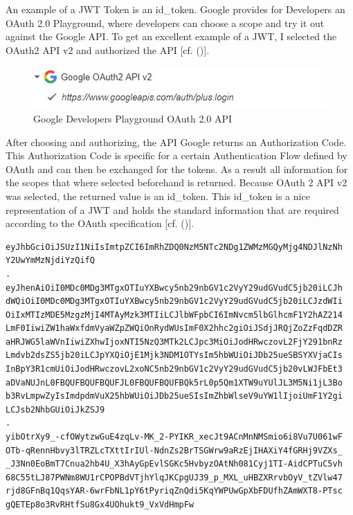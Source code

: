 {{An example of a JWT Token is an id\_token. Google provides for Developers an OAuth 2.0 Playground, where developers can choose a scope and try it out against the Google API. To get an excellent example of a JWT, I selected the OAuth2 API v2 and authorized the API [cf. (\cite{Google:2018:OAuthPlayground})].


\begin{figure}[h]
	\centering
	\includegraphics[width=0.8\linewidth]{images/googleOAuthPlaygroundOAuthAPI}
	\caption[OAuth API]{Google Developers Playground OAuth 2.0 API}
	\label{fig:googleoauthplaygroundoauthapi}
\end{figure}

After choosing and authorizing, the API Google returns an Authorization Code. This Authorization Code is specific for a certain Authentication Flow defined by OAuth and can then be exchanged for the tokens. As a result all information for the scopes that where selected beforehand is returned. Because OAuth 2 API v2 was selected, the returned value is an id\_token. This id\_token is a nice representation of a JWT and holds the standard information that are required according to the OAuth specification  [cf. (\cite{Google:2018:OAuthPlayground})].



\begin{lstlisting}
eyJhbGciOiJSUzI1NiIsImtpZCI6ImRhZDQ0NzM5NTc2NDg1ZWMzMGQyMjg4NDJlNzNh
Y2UwYmMzNjdiYzQifQ
.
eyJhenAiOiI0MDc0MDg3MTgxOTIuYXBwcy5nb29nbGV1c2VyY29udGVudC5jb20iLCJh
dWQiOiI0MDc0MDg3MTgxOTIuYXBwcy5nb29nbGV1c2VyY29udGVudC5jb20iLCJzdWIi
OiIxMTIzMDE5MzgzMjI4MTAyMzk3MTIiLCJlbWFpbCI6ImNvcm5lbGlhcmF1Y2hAZ214
LmF0IiwiZW1haWxfdmVyaWZpZWQiOnRydWUsImF0X2hhc2giOiJSdjJRQjZoZzFqdDZR
aHRJWG5laWVnIiwiZXhwIjoxNTI5NzQ3MTk2LCJpc3MiOiJodHRwczovL2FjY291bnRz
Lmdvb2dsZS5jb20iLCJpYXQiOjE1Mjk3NDM1OTYsIm5hbWUiOiJDb25ueSBSYXVjaCIs
InBpY3R1cmUiOiJodHRwczovL2xoNC5nb29nbGV1c2VyY29udGVudC5jb20vLWJFbEt3
aDVaNUJnL0FBQUFBQUFBQUFJL0FBQUFBQUFBQk5rL0p5Qm1XTW9uYUlJL3M5Ni1jL3Bo
b3RvLmpwZyIsImdpdmVuX25hbWUiOiJDb25ueSIsImZhbWlseV9uYW1lIjoiUmF1Y2gi
LCJsb2NhbGUiOiJkZSJ9
.
yibOtrXy9_-cfOWytzwGuE4zqLv-MK_2-PYIKR_xecJt9ACnMnNMSmio6i8Vu7U061wF
OTb-qRennHbvy3lTRZLcTXttIrIUl-NdnZs2BrTSGWrw9aRzEjIHAXiY4fGRHj9VZXs_
_J3Nn0EoBmT7Cnua2hb4U_X3hAyGpEvlSGKc5HvbyzOAtNh081Cyj1TI-AidCPTuC5vh
68C55tLJ87PWNm8WU1rCPOPBdVTjhYlqJKCpgUJ39_p_MXL_uHBZXRrvbOyV_tZVlw47
rjd8GFnBq1QqsYAR-6wrFbNL1pY6tPyriqZnQdi5KqYWPUwGpXbFDUfhZAmWXT8-PTsc
gQETEp8o3RvRHtfSu8Gx4UOhukt9_VxVdHmpFw
\end{lstlisting}


}}
